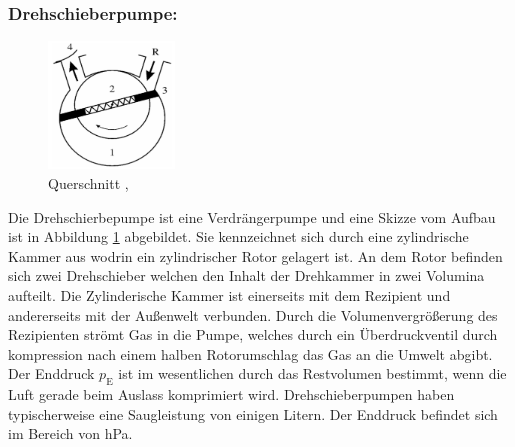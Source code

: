\subsubsection{Drehschieberpumpe:}
\begin{figure}
    \vspace{-1cm}
    \centering
    \includegraphics[width=0.3\textwidth]{./picture/Drehschieberpumpe.png}
    \caption{Querschnitt \cite{Dreh},\cite{Jena}}
    \label{fig:Dreh}
\end{figure}
Die Drehschierbepumpe ist eine Verdrängerpumpe und eine Skizze vom Aufbau ist in Abbildung \ref{fig:Dreh} abgebildet. Sie kennzeichnet sich durch eine zylindrische Kammer aus wodrin ein zylindrischer Rotor gelagert ist. An dem Rotor befinden sich zwei Drehschieber welchen den Inhalt der Drehkammer in zwei Volumina aufteilt. Die Zylinderische Kammer ist einerseits mit dem Rezipient und andererseits mit der Außenwelt verbunden. Durch die Volumenvergrößerung des Rezipienten strömt Gas in die Pumpe, welches durch ein Überdruckventil durch kompression nach einem halben Rotorumschlag das Gas an die Umwelt abgibt. Der Enddruck $p_\text{E}$ ist im wesentlichen durch das Restvolumen bestimmt, wenn die Luft gerade beim Auslass komprimiert wird. Drehschieberpumpen haben typischerweise eine Saugleistung von einigen Litern. Der Enddruck befindet sich im Bereich von hPa.
